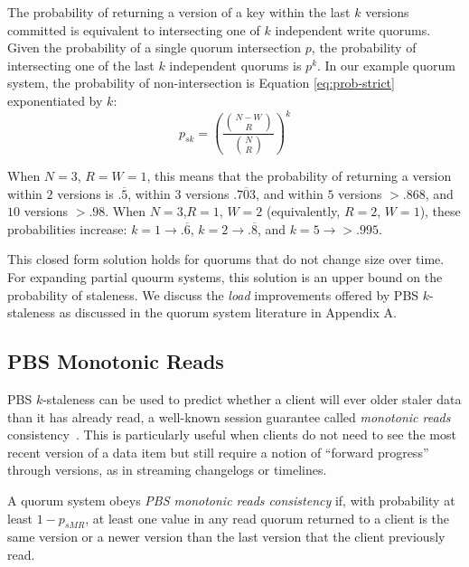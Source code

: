 \documentclass{vldb}
\newcommand{\subsectionskip}{-0em}
\begin{document}
The probability of returning a version of a key within the last $k$
versions committed is equivalent to intersecting one of $k$
independent write quorums.  Given the probability of a single quorum
intersection $p$, the probability of intersecting one of the last $k$
independent quorums is $p^k$.  In our example quorum system, the
probability of non-intersection is Equation \ref{eq:prob-strict}
exponentiated by $k$:
\begin{equation}
\label{eq:k-consistency}
p_{sk} = \left(\frac{{N-W \choose R}}{{N \choose R}}\right)^k
\end{equation}

When $N$$=$$3$, $R$$=$$W$$=$$1$, this means that the probability of
returning a version within $2$ versions is $.\overline{5}$, within $3$
versions $.\overline{703}$, and within $5$ versions $> .868$, and $10$
versions $>.98$.  When $N$$=$$3$,$R$$=$$1$, $W$$=$$2$ (equivalently,
$R$$=$$2$, $W$$=$$1$), these probabilities increase: $k$$=$$1
\rightarrow .\overline{6}$, $k$$=$$2 \rightarrow .\overline{8}$, and
$k$$=$$5 \rightarrow > .995$.

This closed form solution holds for quorums that do not change size
over time.  For expanding partial quourm systems, this solution is an
upper bound on the probability of staleness.  We discuss the
\textit{load} improvements offered by PBS $k$-staleness as discussed
in the quorum system literature in Appendix A.

\vspace{\subsectionskip}\subsection{PBS Monotonic Reads}

PBS $k$-staleness can be used to predict whether a client will ever
older staler data than it has already read, a well-known session
guarantee called \textit{monotonic reads}
consistency~\cite{sessionguarantees}.  This is particularly useful
when clients do not need to see the most recent version of a data item
but still require a notion of ``forward progress'' through versions,
as in streaming changelogs or timelines.

\begin{definition}
\label{def:prob-mr}
A quorum system obeys \textit{PBS monotonic reads consistency} if,
with probability at least $1-p_{sMR}$, at least one value in any
read quorum returned to a client is the same version or a newer
version than the last version that the client previously read.
\end{definition}
\end{document}
